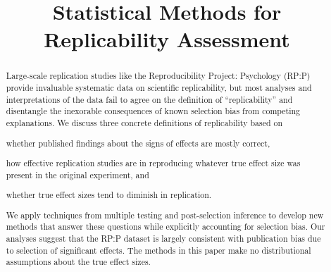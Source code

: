 \documentclass[aoas, preprint]{imsart}
\theoremstyle{definition}
\theoremstyle{custom}
\begin{document}
\begin{frontmatter}

\title{Statistical Methods for Replicability Assessment}


\begin{abstract}
  Large-scale replication studies like the Reproducibility Project: Psychology (RP:P) provide invaluable systematic data on scientific replicability, but most analyses and interpretations of the data fail to agree on the definition of ``replicability'' and disentangle the inexorable consequences of known selection bias from competing explanations. We discuss three concrete definitions of replicability based on
  \begin{inlinelist}
    \item whether published findings about the signs of effects are mostly correct,
    \item how effective replication studies are in reproducing whatever true effect size was present in the original experiment, and
    \item whether true effect sizes tend to diminish in replication.
  \end{inlinelist}
  We apply techniques from multiple testing and post-selection inference to develop new methods that answer these questions while explicitly accounting for selection bias. Our analyses suggest that the RP:P dataset is largely consistent with publication bias due to selection of significant effects. The methods in this paper make no distributional assumptions about the true effect sizes.
\end{abstract}

\begin{keyword}[class=MSC]
\end{keyword}

\begin{keyword}
\end{keyword}

\end{frontmatter}
\end{document}
